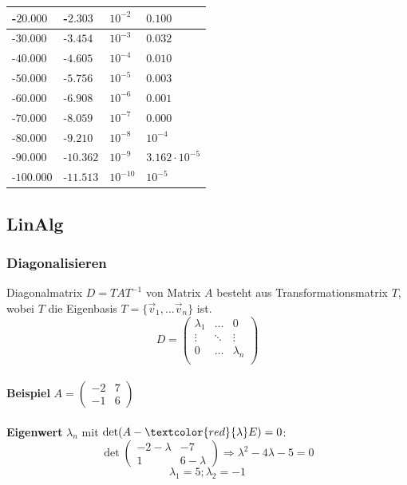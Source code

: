 \begin{center}
{\begin{tabular}{l|l|l|l}
		-$20.000$ & -$2.303$ & $10^{-2}$ & $0.100$ \\ \hline
		-$30.000$ & -$3.454$ & $10^{-3}$ & $0.032$ \\ \hline
		-$40.000$ & -$4.605$ & $10^{-4}$ & $0.010$ \\ \hline
		-$50.000$ & -$5.756$ & $10^{-5}$ & $0.003$ \\ \hline
		-$60.000$ & -$6.908$ & $10^{-6}$ & $0.001$ \\ \hline
		-$70.000$ & -$8.059$ & $10^{-7}$ & $0.000$ \\ \hline
		-$80.000$ & -$9.210$ & $10^{-8}$ & $10^{-4}$ \\ \hline
		-$90.000$ & -$10.362$ & $10^{-9}$ & $3.162 \cdot 10^{-5}$ \\ \hline
		-$100.000$ & -$11.513$ & $10^{-10}$ & $10^{-5}$ \\ \hline
	\end{tabular}
}
\end{center}

\subsection{LinAlg}
\subsubsection{Diagonalisieren}\label{charakteristischempolynom}
Diagonalmatrix $D=TAT^{-1}$ von Matrix $A$ besteht aus Transformationsmatrix $T$, wobei $T$ die Eigenbasis $T = \{\vec{v}_1,\dots\vec{v}_n\}$ ist.
\[D = \begin{pmatrix}
	\lambda_1 & \dots & 0 \\
	\vdots & \ddots & \vdots \\
	0 & \dots & \lambda_n \\
\end{pmatrix}\]
~\\
\noindent\textbf{Beispiel}
$A = \begin{pmatrix} -2 & 7 \\ -1 & 6 \end{pmatrix}$
\\ \\
\noindent \textbf{Eigenwert} $\lambda_n$ mit $\det(A - \textcolor{red}{\lambda} E) = 0$:
\[\det\begin{pmatrix}
	-2 - \lambda & -7 \\
	1 & 6 - \lambda
\end{pmatrix} \Rightarrow \lambda^2 - 4\lambda - 5 = 0\]
\[{\scriptstyle \lambda_1 = 5; \lambda_2 = -1}\]
~\\

